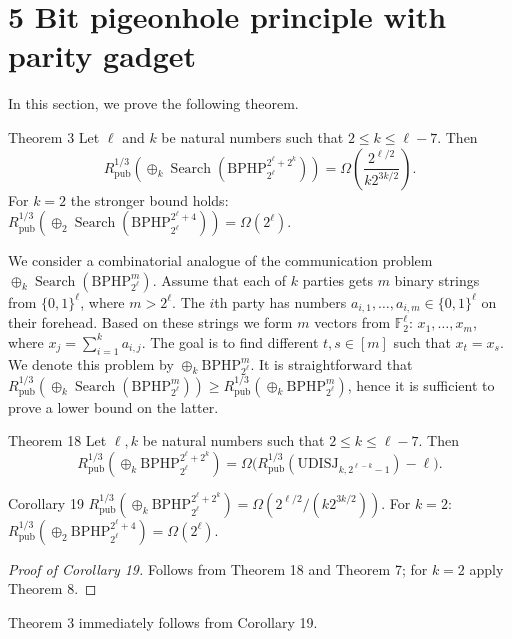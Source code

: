 \section*{5 Bit pigeonhole principle with parity gadget}
In this section, we prove the following theorem.
\begin{authorclaim}{Theorem 3}
Let $\ell$ and $k$ be natural numbers such that $2\le k\le\ell-7$. Then
\[
R^{1/3}_{\mathrm{pub}}(\oplus_k\operatorname{Search}(\mathrm{BPHP}_{2^\ell}^{2^\ell+2^k}))
=\Omega\left(\frac{2^{\ell/2}}{k2^{3k/2}}\right).
\]
For $k=2$ the stronger bound holds:
$R^{1/3}_{\mathrm{pub}}(\oplus_2\operatorname{Search}(\mathrm{BPHP}_{2^\ell}^{2^\ell+4}))=\Omega(2^\ell)$.
\end{authorclaim}
We consider a combinatorial analogue of the communication problem $\oplus_k\operatorname{Search}(\mathrm{BPHP}_{2^\ell}^m)$. Assume that each of $k$ parties gets $m$ binary strings from $\{0,1\}^\ell$, where $m>2^\ell$. The $i$th party has numbers $a_{i,1},\ldots,a_{i,m}\in\{0,1\}^\ell$ on their forehead. Based on these strings we form $m$ vectors from $\mathbb F_2^\ell$: $x_1,\ldots,x_m$, where $x_j=\sum_{i=1}^ka_{i,j}$. The goal is to find different $t,s\in[m]$ such that $x_t=x_s$. We denote this problem by $\oplus_k\mathrm{BPHP}_{2^\ell}^m$. It is straightforward that $R^{1/3}_{\mathrm{pub}}(\oplus_k\operatorname{Search}(\mathrm{BPHP}_{2^\ell}^m))\ge R^{1/3}_{\mathrm{pub}}(\oplus_k\mathrm{BPHP}_{2^\ell}^m)$, hence it is sufficient to prove a lower bound on the latter.
\begin{authorclaim}{Theorem 18}
Let $\ell,k$ be natural numbers such that $2\le k\le\ell-7$. Then
\[
R^{1/3}_{\mathrm{pub}}(\oplus_k\mathrm{BPHP}_{2^\ell}^{2^\ell+2^k})
=\Omega\big(R^{1/3}_{\mathrm{pub}}(\mathrm{UDISJ}_{k,2^{\ell-k}-1})-\ell\big).
\]
\end{authorclaim}
\begin{authorclaim}{Corollary 19}
$R^{1/3}_{\mathrm{pub}}(\oplus_k\mathrm{BPHP}_{2^\ell}^{2^\ell+2^k})=\Omega(2^{\ell/2}/(k2^{3k/2}))$. For $k=2$: $R^{1/3}_{\mathrm{pub}}(\oplus_2\mathrm{BPHP}_{2^\ell}^{2^\ell+4})=\Omega(2^\ell)$.
\end{authorclaim}
\begin{proof}[Proof of Corollary 19]
Follows from Theorem 18 and Theorem 7; for $k=2$ apply Theorem 8.
\end{proof}
Theorem 3 immediately follows from Corollary 19.
